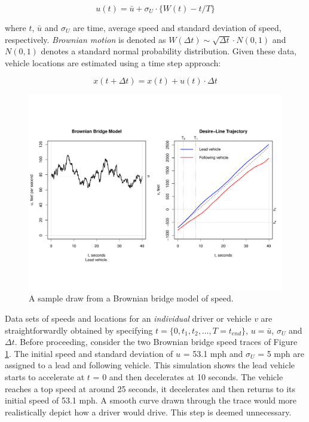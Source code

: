 \documentclass[Proceedings]{ascelike}
\begin{document}
\begin {equation}
u(t)  = \bar{u} + \sigma_U \cdot \big\{ W(t) - t/T \big\} \label{eq:eq1}
\end{equation}

\noindent where $t$, $\bar{u}$ and $\sigma_U$ are time, average speed and standard deviation of speed, respectively. \emph{Brownian motion} is denoted as $W(\Delta t) \sim \sqrt{\Delta t} \cdot N(0,1)$ and $N(0,1)$ denotes a standard normal probability distribution.  Given these data, vehicle locations are estimated using a time step approach:

\begin {equation}
x(t + \Delta t)  = x(t) + u(t) \cdot \Delta t  \label{eq:eq2}
\end{equation}

\begin{figure}
\centering
\includegraphics[width = 5.5in]{Rplot03.pdf}
\caption{A sample draw from a Brownian bridge model of speed. }
\label{bbmodel}
\end{figure}

Data sets of speeds and locations for an \emph{individual} driver or vehicle $v$ are straightforwardly obtained by specifying $t = \{0,t_1,t_2,\ldots,T = t_{end}\}$, $u = \bar{u}$, $\sigma_U$ and $\Delta t$. Before proceeding, consider the two Brownian bridge speed traces of Figure \ref{bbmodel}.  The initial speed  and standard deviation  of $u$ = 53.1 mph and $\sigma_U$ = 5 mph are assigned to a lead and following vehicle. This simulation shows the lead vehicle starts to accelerate at $t$ = 0 and then decelerates at 10 seconds. The vehicle reaches a top speed at around 25 seconds, it decelerates and then returns to its initial speed of 53.1 mph.  A smooth curve drawn through the trace would more realistically depict how a driver would drive. This step is deemed unnecessary.
\end{document}
